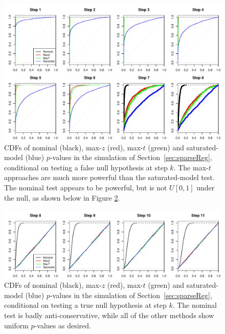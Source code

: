 \documentclass{article}
\begin{document}
\begin{figure}[h]
  \centering
  \includegraphics[width=1\textwidth]{figs/simulation_snr_5_alpha_05_null_false.pdf}
  \caption{  CDFs of nominal (black), max-$z$ (red), max-$t$ (green) and  saturated-model (blue) $p$-values in the simulation of Section~\ref{sec:sparseReg}, conditional on testing a false null hypothesis at step $k$. The max-$t$ approaches are much more powerful than the saturated-model test. The nominal test appears to be powerful, 
  but is not $U[0,1]$ under the null, as shown below in Figure \ref{fig:simulation_null_true}.}
  \label{fig:simulation_null_false}
\end{figure}

\begin{figure}[h]
  \centering
  \includegraphics[width=1\textwidth]{figs/simulation_snr_5_alpha_05_null_true.pdf}
  \caption{  CDFs of nominal (black), max-$z$ (red), max-$t$ (green) and  saturated-model (blue) $p$-values in the simulation of Section~\ref{sec:sparseReg}, conditional on testing a true null hypothesis at step $k$.  The nominal test is badly anti-conservative, while all of the other methods  show uniform $p$-values as desired.}
  \label{fig:simulation_null_true}
\end{figure}
\end{document}
